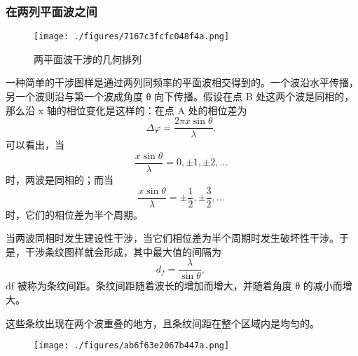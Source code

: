 \subsubsection{在两列平面波之间}
\begin{figure}[ht]
\centering
\texttt{[image: ./figures/7167c3fcfc048f4a.png]}
\caption{两平面波干涉的几何排列} \label{fig_GSWLX_6}
\end{figure}
一种简单的干涉图样是通过两列同频率的平面波相交得到的。一个波沿水平传播，另一个波则沿与第一个波成角度 θ 向下传播。假设在点 B 处这两个波是同相的，那么沿 x 轴的相位变化是这样的：在点 A 处的相位差为
\[
\Delta \varphi = \frac{2\pi x \sin \theta}{\lambda}.~
\]
可以看出，当
\[
\frac{x \sin \theta}{\lambda} = 0, \pm 1, \pm 2, \ldots~
\]
时，两波是同相的；而当
\[
\frac{x \sin \theta}{\lambda} = \pm \frac{1}{2}, \pm \frac{3}{2}, \ldots~
\]
时，它们的相位差为半个周期。

当两波同相时发生建设性干涉，当它们相位差为半个周期时发生破坏性干涉。于是，干涉条纹图样就会形成，其中最大值的间隔为
\[
d_f = \frac{\lambda}{\sin \theta},~
\]
df 被称为条纹间距。条纹间距随着波长的增加而增大，并随着角度 θ 的减小而增大。

这些条纹出现在两个波重叠的地方，且条纹间距在整个区域内是均匀的。
\begin{figure}[ht]
\centering
\texttt{[image: ./figures/ab6f63e2067b447a.png]}
\caption{} \label{fig_GSWLX_7}
\end{figure}